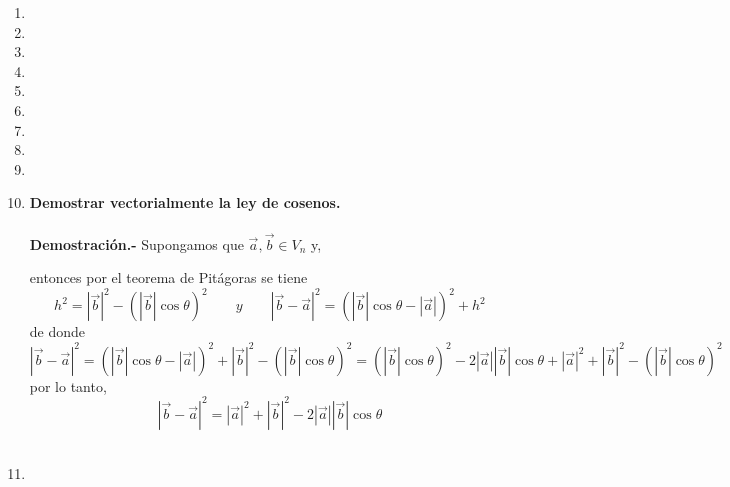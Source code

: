 \begin{enumerate}
\item 

\item 

\item 

\item 

\item 

\item 

\item 

\item

\item 

\item \textbf{\boldmath Demostrar vectorialmente la ley de cosenos.\\\\
    Demostración.-}\; Supongamos que $\vec{a},\vec{b} \in V_n$ y, 
    \begin{center}
    \end{center}
    entonces por el teorema de Pitágoras se tiene $$h^2=|\vec{b}|^2 - \left(|\vec{b}|\cos \theta\right)^2 \qquad y \qquad |\vec{b}-\vec{a}|^2 = \left(|\vec{b}|\cos \theta - |\vec{a}|\right)^2+h^2$$
    de donde $$|\vec{b}-\vec{a}|^2 = \left(|\vec{b}|\cos \theta - |\vec{a}|\right)^2+|\vec{b}|^2 - \left(|\vec{b}|\cos \theta\right)^2 = \left(|\vec{b}|\cos \theta\right)^2 - 2|\vec{a}||\vec{b}|\cos \theta + |\vec{a}|^2 + |\vec{b}|^2 - \left(|\vec{b}|\cos \theta\right)^2$$
    por lo tanto, $$|\vec{b}-\vec{a}|^2 = |\vec{a}|^2 + |\vec{b}|^2 - 2|\vec{a}||\vec{b}|\cos \theta $$\\

\item 

\end{enumerate}


